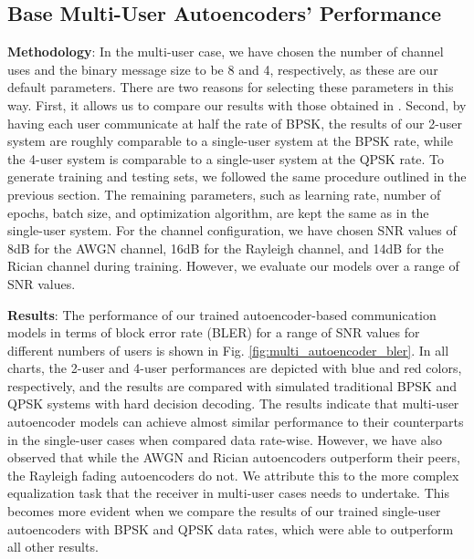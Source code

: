 \subsection{Base Multi-User Autoencoders' Performance}
\textbf{Methodology}: In the multi-user case, we have chosen the number of channel uses and the binary message size to be 8 and 4, respectively, as these are our default parameters. There are two reasons for selecting these parameters in this way. First, it allows us to compare our results with those obtained in \cite{o2017introduction}. Second, by having each user communicate at half the rate of BPSK, the results of our 2-user system are roughly comparable to a single-user system at the BPSK rate, while the 4-user system is comparable to a single-user system at the QPSK rate. To generate training and testing sets, we followed the same procedure outlined in the previous section. The remaining parameters, such as learning rate, number of epochs, batch size, and optimization algorithm, are kept the same as in the single-user system. For the channel configuration, we have chosen SNR values of 8dB for the AWGN channel, 16dB for the Rayleigh channel, and 14dB for the Rician channel during training. However, we evaluate our models over a range of SNR values.

\textbf{Results}: The performance of our trained autoencoder-based communication models in terms of block error rate (BLER) for a range of SNR values for different numbers of users is shown in Fig. \ref{fig:multi_autoencoder_bler}. In all charts, the 2-user and 4-user performances are depicted with blue and red colors, respectively, and the results are compared with simulated traditional BPSK and QPSK systems with hard decision decoding.
The results indicate that multi-user autoencoder models can achieve almost similar performance to their counterparts in the single-user cases when compared data rate-wise. However, we have also observed that while the AWGN and Rician autoencoders outperform their peers, the Rayleigh fading autoencoders do not. We attribute this to the more complex equalization task that the receiver in multi-user cases needs to undertake. This becomes more evident when we compare the results of our trained single-user autoencoders with BPSK and QPSK data rates, which were able to outperform all other results.

